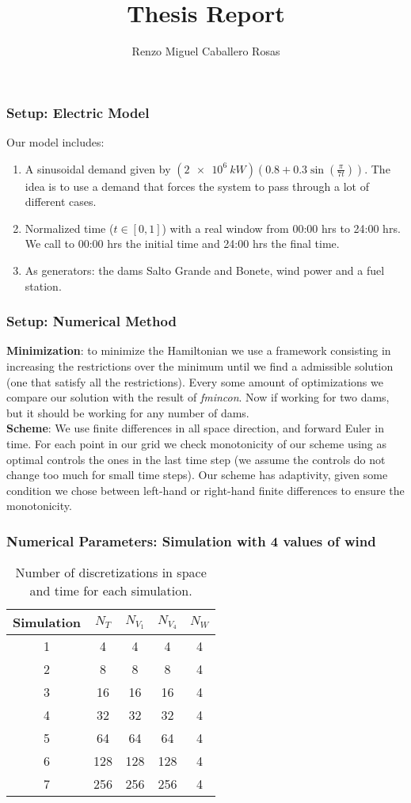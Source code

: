\documentclass[aspectratio=169]{beamer}\usepackage[utf8]{inputenc}
\title{Thesis Report}
\subtitle{Renzo Miguel Caballero Rosas}
\begin{document}
\begin{frame}
\titlepage
\end{frame}

\begin{frame}\frametitle{Setup: Electric Model}
Our model includes:
\begin{enumerate}
\item A sinusoidal demand given by $(\SI{2e6}{kW})\left(0.8+0.3\sin\left(\frac{\pi}{7t}\right)\right)$. The idea is to use a demand that forces the system to pass through a lot of different cases.
\item Normalized time ($t\in[0,1]$) with a real window from 00:00 hrs to 24:00 hrs. We call to 00:00 hrs the initial time and 24:00 hrs the final time.
\item As generators: the dams Salto Grande and Bonete, wind power and a fuel station.
\end{enumerate}
\end{frame}

\begin{frame}\frametitle{Setup: Numerical Method}
\textbf{Minimization}: to minimize the Hamiltonian we use a framework consisting in increasing the restrictions over the minimum until we find a admissible solution (one that satisfy all the restrictions). Every some amount of optimizations we compare our solution with the result of \emph{fmincon}. Now if working for two dams, but it should be working for any number of dams.\\
\textbf{Scheme}: We use finite differences in all space direction, and forward Euler in time. For each point in our grid we check monotonicity of our scheme using as optimal controls the ones in the last time step (we assume the controls do not change too much for small time steps). Our scheme has adaptivity, given some condition we chose between left-hand or right-hand finite differences to ensure the monotonicity.
\end{frame}

\begin{frame}\frametitle{Numerical Parameters: Simulation with 4 values of wind}
\begin{table}[]
\begin{tabular}{ccccc}
\toprule
Simulation & $N_T$ & $N_{V_1}$ & $N_{V_4}$ & $N_W$ \\ \midrule
1 & 4 & 4 & 4 & 4 \\
2 & 8 & 8 & 8 & 4 \\
3 & 16 & 16 & 16 & 4 \\
4 & 32 & 32 & 32 & 4 \\
5 & 64 & 64 & 64 & 4 \\
6 & 128 & 128 & 128 & 4 \\
7 & 256 & 256 & 256 & 4 \\ \bottomrule
\end{tabular}
\caption{Number of discretizations in space and time for each simulation.}
\label{Table_1}
\end{table}
\end{frame}
\end{document}
